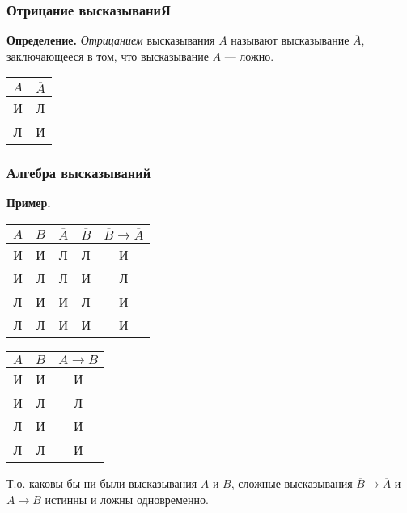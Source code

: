 \documentclass{article}
\begin{document}
    \subsubsection{Отрицание высказываниЯ}

    \textbf{Определение.} \textit{Отрицанием} высказывания \(A\) называют высказывание \(\overline{A}\), заключающееся в том, что высказывание \(A\) --- ложно.

    \begin{center}
        \begin{tabular}{||c | c||}
            \hline
            \(A\) & \(\overline{A}\)\\
            \hline \hline
            И & Л\\
            \hline
            Л & И\\
            \hline
        \end{tabular}
    \end{center}

    \subsubsection{Алгебра высказываний}

    \textbf{Пример.}

    \begin{tabular}{||c | c | c | c | c||}
        \hline
        \(A\) &  \(B\) & \(\overline{A}\) & \(\overline{B}\) & \(\overline{B} \rightarrow \overline{A}\)\\
        \hline \hline
        И & И & Л & Л & И\\
        \hline
        И & Л & Л & И & Л\\
        \hline
        Л & И & И & Л & И\\
        \hline
        Л & Л & И & И & И\\
        \hline
    \end{tabular} \qquad
    \begin{tabular}{||c | c | c||}
        \hline
        \(A\) &  \(B\) & \(A \rightarrow B\)\\
        \hline \hline
        И & И & И\\
        \hline
        И & Л & Л\\
        \hline
        Л & И & И\\
        \hline
        Л & Л & И\\
        \hline
    \end{tabular}

    Т.о. каковы бы ни были высказывания \(A\) и \(B\), сложные высказывания \(\overline{B} \rightarrow \overline{A}\) и \(A \rightarrow B\) истинны и ложны одновременно.
\end{document}
